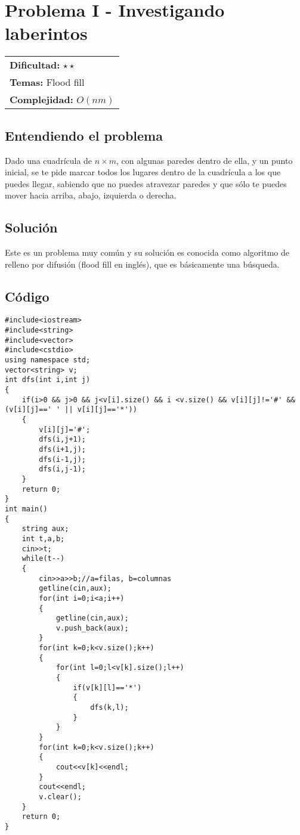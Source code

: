 \section{Problema I - Investigando laberintos}

\hfill
\begin{tabular}{@{}l@{}}
\textbf{Dificultad:} $\star \star$ \\
\textbf{Temas:} Flood fill \\
\textbf{Complejidad:} $O(nm)$
\end{tabular}

\subsection*{Entendiendo el problema}
Dado una cuadrícula de $n \times m$, con algunas paredes dentro de ella, y un punto inicial, se te pide marcar todos los lugares dentro de la cuadrícula a los que puedes llegar, sabiendo que no puedes atravezar paredes y que sólo te puedes mover hacia arriba, abajo, izquierda o derecha.
\subsection*{Solución}
Este es un problema muy común y su solución es conocida como algoritmo de relleno por difusión (flood fill en inglés), que es básicamente una búsqueda. 
\subsection*{Código}

\begin{verbatim}
#include<iostream>
#include<string>
#include<vector>
#include<cstdio>
using namespace std;
vector<string> v;
int dfs(int i,int j)
{
    if(i>0 && j>0 && j<v[i].size() && i <v.size() && v[i][j]!='#' && (v[i][j]==' ' || v[i][j]=='*'))
    {
        v[i][j]='#';
        dfs(i,j+1);
        dfs(i+1,j);
        dfs(i-1,j);
        dfs(i,j-1);
    }
    return 0;
}
int main()
{
    string aux;
    int t,a,b;
    cin>>t;
    while(t--)
    {
        cin>>a>>b;//a=filas, b=columnas
        getline(cin,aux);
        for(int i=0;i<a;i++)
        {
            getline(cin,aux);
            v.push_back(aux);
        }
        for(int k=0;k<v.size();k++)
        {
            for(int l=0;l<v[k].size();l++)
            {
                if(v[k][l]=='*')
                {
                    dfs(k,l);
                }
            }
        }
        for(int k=0;k<v.size();k++)
        {
            cout<<v[k]<<endl;
        }
        cout<<endl;
        v.clear();
    }
    return 0;
}
\end{verbatim}